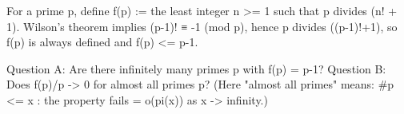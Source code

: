 For a prime p, define
  f(p) := the least integer n >= 1 such that p divides (n! + 1).
Wilson's theorem implies (p-1)! ≡ -1 (mod p), hence p divides ((p-1)!+1), so f(p) is always defined and f(p) <= p-1.

Question A: Are there infinitely many primes p with f(p) = p-1?
Question B: Does f(p)/p -> 0 for almost all primes p?
(Here "almost all primes" means: #{p <= x : the property fails} = o(pi(x)) as x -> infinity.)
